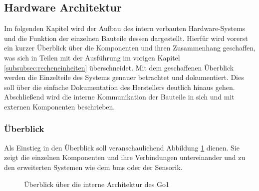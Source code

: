 \subsection{Hardware Architektur} %
\label{subsec:hardware-architektur}

Im folgenden Kapitel wird der Aufbau des intern verbauten Hardware-Systems und die Funktion der einzelnen Bauteile
dessen dargestellt.
Hierfür wird vorerst ein kurzer Überblick über die Komponenten und ihren Zusammenhang geschaffen, was sich in Teilen
mit der Ausführung im vorigen Kapitel \ref{subsubsec:recheneinheiten} überschneidet.
Mit dem geschaffenen Überblick werden die Einzelteile des Systems genauer betrachtet und dokumentiert.
Dies soll über die einfache Dokumentation des Herstellers deutlich hinaus gehen.
Abschließend wird die interne Kommunikation der Bauteile in sich und mit externen Komponenten beschrieben.

\subsubsection{Überblick}
\label{subsubsec:ueberblick_hardware}

Als Einstieg in den Überblick soll veranschaulichend Abbildung \ref{fig:hardware_ueberblick} dienen.
Sie zeigt die einzelnen Komponenten und ihre Verbindungen untereinander und zu den erweiterten Systemen wie dem \gls{bms}
oder der Sensorik.

\begin{figure}[h]
    \caption{Überblick über die interne Architektur des Go1}\label{fig:hardware_ueberblick}
\end{figure}

